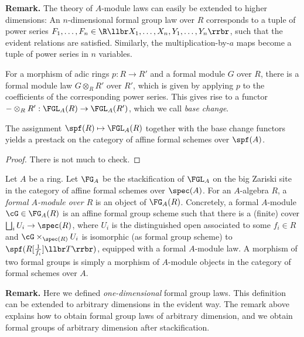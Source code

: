 \documentclass[../main.tex]{subfiles}
\begin{document}
\textbf{Remark.} The theory of $A$-module laws can easily be extended to higher 
dimensions: An $n$-dimensio\-nal formal group law over $R$ corresponds to a
tuple of power series $F_1, \dots, F_n \in \R\llbr X_1, \dots, X_n,\allowbreak
Y_1, \dots, Y_n \rrbr$, such that the evident relations are satisfied.
Similarly, the multiplication-by-$a$ maps become a tuple of power series in $n$
variables.

\begin{defi}
    For a morphism of adic rings $p: R \to R'$ and a formal module $G$ over $R$,
    there is a formal module law $G \otimes_R R'$ over $R'$, which 
    is given by applying $p$ to the coefficients of the corresponding power
    series. This gives rise to a functor $- \otimes_R R': \FGL_A(R) \to \FGL_A(R')$, 
    which we call \emph{base change}. 
\end{defi}

\begin{lem}
    The assignment $\spf(R) \mapsto \FGL_A(R)$ together with the base change 
    functors yields a prestack on the category of affine formal schemes over $\spf(A)$.
\begin{proof}
    There is not much to check. 
\end{proof}
\end{lem}

\begin{defi}
    Let $A$ be a ring.
    Let $\FG_A$ be the stackification of $\FGL_A$ on the big Zariski site in the 
    category of affine formal schemes over $\spec(A)$. For an $A$-algebra
    $R$, a \emph{formal $A$-module over $R$} is an object of $\FG_A(R)$.
    Concretely, a formal $A$-module $\cG \in \FG_A(R)$ is an
    affine formal group scheme such that there is a (finite) cover
    $\bigsqcup_i U_i \to \spec(R)$, where $U_i$ is the distinguished open associated 
    to some $f_i \in R$ and $\cG \times_{\spec(R)} U_i$ is isomorphic (as 
    formal group scheme) to $\spf(R[\tfrac1{f_i}] \llbr T \rrbr)$, equipped with
    a formal $A$-module law. A morphism of two formal groups is simply
    a morphism of $A$-module objects in the category of formal schemes over $A$.
\end{defi}
\textbf{Remark.} Here we defined \textit{one-dimensional} formal group laws. This 
definition can be extended to arbitrary dimensions in the evident way. The remark 
above explains how to obtain formal group laws of arbitrary dimension, and we obtain
formal groups of arbitrary dimension after stackification.
\end{document}
